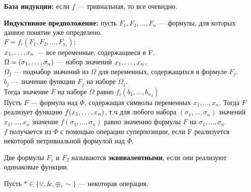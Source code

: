 \textbf{База индукции:} если $f$ --- тривиальная, то все очевидно.

\textbf{Индуктивное предположение:} пусть $F_1,F_2, \ldots, F_n$ --- формулы, для которых данное понятие уже определено. \\
$F=f_i(F_1,F_2, \ldots, {F_{n_i}});$ \\
$x_1, \ldots, x_n$ --- все переменные, содержащиеся в F. \\
$\Omega=(\sigma_1, \ldots, \sigma_n)$ --- набор значений $x_1, \ldots, x_n$. \\
$\Omega_j$ --- поднабор значений из $\Omega$ для переменных, содержащихся в формуле $F_j$. \\
$b_j$ --- значение функции $F_j$ на наборе $\Omega_j$. \\
Тогда значение $F$ на наборе $\Omega$ равно $f_i(b_1, \ldots, {b_n}_i)$ \\
Пусть $F$ --- формула над $\Phi$, содержащая символы переменных $x_1, \ldots, x_n$. Тогда $F$ реализует функцию $f(x_1, \ldots, x_n)$, т.ч для любого набора $(\sigma_1, \ldots, \sigma_n)$ значений $x_1,...,x_n$ значение $f(\sigma_1, \ldots, \sigma_n)$ равно значению формулы $F$ на $\sigma_1, \ldots, \sigma_n$. \\
$f$ получается из $\Phi$ с помощью операции суперпозиции, если F реализуется некоторой нетривиальной формулой над $\Phi$.

\begin{definition}
Две формулы $F_1$ и $F_2$ называются {\bf эквивалентными}, если они реализуют одинаковые функции.
\end{definition}

Пусть $\ast \in \{\vee, \&, \oplus, \sim \}$ --- некоторая операция.


